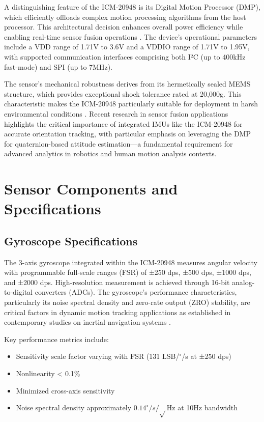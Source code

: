 A distinguishing feature of the ICM-20948 is its Digital Motion Processor (DMP), which efficiently offloads complex motion processing algorithms from the host processor. This architectural decision enhances overall power efficiency while enabling real-time sensor fusion operations \cite{Wen:2014}. The device's operational parameters include a VDD range of 1.71V to 3.6V and a VDDIO range of 1.71V to 1.95V, with supported communication interfaces comprising both I²C (up to 400kHz fast-mode) and SPI (up to 7MHz).

The sensor's mechanical robustness derives from its hermetically sealed MEMS structure, which provides exceptional shock tolerance rated at 20,000g. This characteristic makes the ICM-20948 particularly suitable for deployment in harsh environmental conditions \cite{Wen:2014}. Recent research in sensor fusion applications highlights the critical importance of integrated IMUs like the ICM-20948 for accurate orientation tracking, with particular emphasis on leveraging the DMP for quaternion-based attitude estimation—a fundamental requirement for advanced analytics in robotics and human motion analysis contexts.

\section{Sensor Components and Specifications}
\subsection{Gyroscope Specifications}
The 3-axis gyroscope integrated within the ICM-20948 measures angular velocity with programmable full-scale ranges (FSR) of ±250 dps, ±500 dps, ±1000 dps, and ±2000 dps. High-resolution measurement is achieved through 16-bit analog-to-digital converters (ADCs). The gyroscope's performance characteristics, particularly its noise spectral density and zero-rate output (ZRO) stability, are critical factors in dynamic motion tracking applications as established in contemporary studies on inertial navigation systems \cite{Wen:2014,TDK:2024}.

Key performance metrics include:
\begin{itemize}
    \item Sensitivity scale factor varying with FSR (131 LSB/$^\circ$/s at ±250 dps)
    \item Nonlinearity < 0.1\%
    \item Minimized cross-axis sensitivity
    \item Noise spectral density approximately $0.14^\circ /s/\sqrt{}$Hz
    at 10Hz bandwidth 
\end{itemize}


